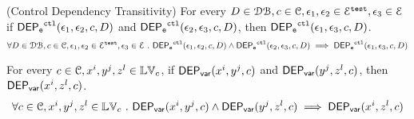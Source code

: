 %
%
\begin{lem}(Control Dependency Transitivity)
\label{lem:ctl_trans}
For every $D \in \dbdom , c \in \cdom, \event_1, \event_2 \in \eventset^{\test}, \event_3 \in \eventset$
if $\eventdep^{\ctl}(\event_1, \event_2, c, D)$ and $\eventdep^{\ctl}(\event_2, \event_3, c, D)$,
then $\eventdep^{\ctl}(\event_1, \event_3, c, D)$.
%
\[
  \forall D \in \dbdom , c \in \cdom, \event_1, \event_2 \in \eventset^{\test}, \event_3 \in \eventset \st
  \eventdep^{\ctl}(\event_1, \event_2, c, D) 
  \land \eventdep^{\ctl}(\event_2, \event_3, c, D)
  \implies \eventdep^{\ctl}(\event_1, \event_3, c, D)
\]
\end{lem}
%
%
\begin{lem}
	\label{lem:vardep_trans}
For every $c \in \cdom, x^i, y^j, z^l \in \lvar_c$, 
if $\vardep(x^i, y^j, c)$ and 
$\vardep(y^j, z^l, c)$, then $\vardep(x^i, z^l, c)$.
	\[
	\forall c \in \cdom, x^i, y^j, z^l \in \lvar_c \st 
	\vardep(x^i, y^j, c) 
	\land
	\vardep(y^j, z^l, c) 
	\implies
	\vardep(x^i, z^l, c)
	\]
  \end{lem}
%
